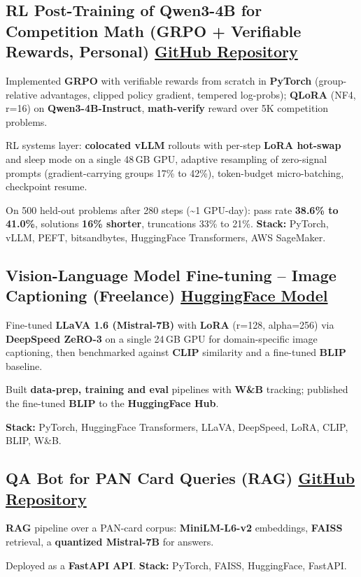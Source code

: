 \documentclass[letter,10pt]{article}
\begin{document}
\subsection{RL Post-Training of Qwen3-4B for Competition Math (GRPO + Verifiable Rewards, Personal) \hfill \href{https://github.com/sunil448832/preference-alignment-grpo}{GitHub Repository}}
\begin{zitemize}
\item Implemented \textbf{GRPO} with verifiable rewards from scratch in \textbf{PyTorch} (group-relative advantages, clipped policy gradient, tempered log-probs); \textbf{QLoRA} (NF4, r=16) on \textbf{Qwen3-4B-Instruct}, \textbf{math-verify} reward over 5K competition problems.
\item RL systems layer: \textbf{colocated vLLM} rollouts with per-step \textbf{LoRA hot-swap} and sleep mode on a single 48\,GB GPU, adaptive resampling of zero-signal prompts (gradient-carrying groups 17\% to 42\%), token-budget micro-batching, checkpoint resume.
\item On 500 held-out problems after 280 steps (\textasciitilde1 GPU-day): pass rate \textbf{38.6\% to 41.0\%}, solutions \textbf{16\% shorter}, truncations 33\% to 21\%. \textbf{Stack:} PyTorch, vLLM, PEFT, bitsandbytes, HuggingFace Transformers, AWS SageMaker.
\end{zitemize}

\subsection{Vision-Language Model Fine-tuning – Image Captioning (Freelance) \hfill \href{https://huggingface.co/sunil448832/blip-model}{HuggingFace Model}}
\begin{zitemize}
\item Fine-tuned \textbf{LLaVA 1.6 (Mistral-7B)} with \textbf{LoRA} (r=128, alpha=256) via \textbf{DeepSpeed ZeRO-3} on a single 24\,GB GPU for domain-specific image captioning, then benchmarked against \textbf{CLIP} similarity and a fine-tuned \textbf{BLIP} baseline.
\item Built \textbf{data-prep, training and eval} pipelines with \textbf{W\&B} tracking; published the fine-tuned \textbf{BLIP} to the \textbf{HuggingFace Hub}.
\item \textbf{Stack:} PyTorch, HuggingFace Transformers, LLaVA, DeepSpeed, LoRA, CLIP, BLIP, W\&B.
\end{zitemize}

\subsection{QA Bot for PAN Card Queries (RAG) \hfill \href{https://github.com/sunil448832/Natural-Language-Processing/tree/master/RAG(Retrieval\%20Augment\%20Generation)}{GitHub Repository}}
\begin{zitemize}
\item \textbf{RAG} pipeline over a PAN-card corpus: \textbf{MiniLM-L6-v2} embeddings, \textbf{FAISS} retrieval, a \textbf{quantized Mistral-7B} for answers.
\item Deployed as a \textbf{FastAPI} \textbf{API}. \textbf{Stack:} PyTorch, FAISS, HuggingFace, FastAPI.
\end{zitemize}
\end{document}
